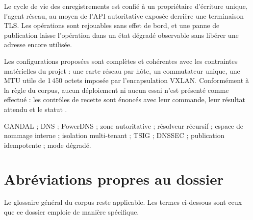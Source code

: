 Le cycle de vie des enregistrements est confié à un propriétaire d'écriture
unique, l'agent réseau, au moyen de l'API autoritative exposée derrière une
terminaison TLS. Les opérations sont rejouables sans effet de bord, et une
panne de publication laisse l'opération dans un état dégradé observable sans
libérer une adresse encore utilisée.

Les configurations proposées sont complètes et cohérentes avec les contraintes
matérielles du projet : une carte réseau par hôte, un commutateur unique, une
MTU utile de 1\,450 octets imposée par l'encapsulation VXLAN. Conformément
à la règle du corpus, aucun déploiement ni aucun essai n'est présenté comme
effectué : les contrôles de recette sont énoncés avec leur commande, leur
résultat attendu et le statut .

\begin{encadre}
GANDAL ; DNS ; PowerDNS ; zone autoritative ; résolveur récursif ; espace de
nommage interne ; isolation multi-tenant ; TSIG ; DNSSEC ; publication
idempotente ; mode dégradé.
\end{encadre}

\section*{Abréviations propres au dossier}

Le glossaire général du corpus reste applicable. Les termes ci-dessous sont
ceux que ce dossier emploie de manière spécifique.

